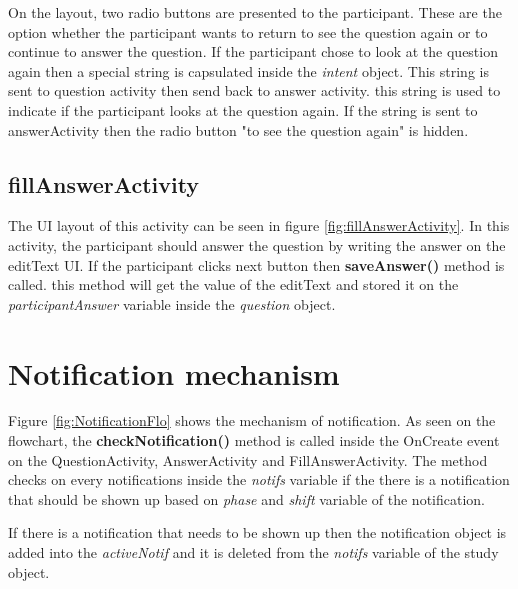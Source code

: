 On the layout, two radio buttons are presented to the participant. These are the option whether the participant wants to return to see the question again or to continue
 to answer the question.
If the participant chose to look at the question again then a special string is capsulated inside the \textit{intent} object.
This string is sent to question activity then send back to answer activity. this string is used to indicate if the participant looks at the question again.
If the string is sent to answerActivity then the radio button "to see the question again" is hidden.


\subsection{fillAnswerActivity}
The UI layout of this activity can be seen in figure \ref{fig:fillAnswerActivity}.
In this activity, the participant should answer the question by writing the answer on the editText UI.
If the participant clicks next button then \textbf{saveAnswer()} method is called. this method will get the value of the editText
and stored it on the \textit{participantAnswer} variable inside the \textit{question} object.


\section{Notification mechanism}
Figure \ref{fig:NotificationFlo} shows the mechanism of notification.
As seen on the flowchart, the \textbf{checkNotification()} method is called inside
the OnCreate event on the QuestionActivity, AnswerActivity and FillAnswerActivity.
The method checks on every notifications inside the \textit{notifs} variable if the there is a notification that should be shown up based on \textit{phase} and \textit{shift} variable of the notification.

If there is a notification that needs to be shown up then the notification object is added into the \textit{activeNotif} and it is deleted from the \textit{notifs} variable of the study object.

